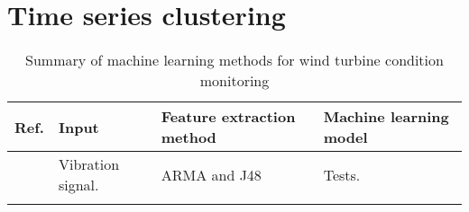 \newpage
\section{Time series clustering}

\begin{longtable}{p{}p{}p{}p{}}
    \hline
    Ref. & Input & Feature extraction method & Machine learning model \\
    \hline \hline
    \cite{ml_cm_wt_blade_ARMA_2018} & Vibration signal. & ARMA and J48 & Tests. \\  \hline
    \hline
    \caption{Summary of machine learning methods for wind turbine condition monitoring}
    \label{tab:machine_learning_wt_cm_summary}
\end{longtable}
